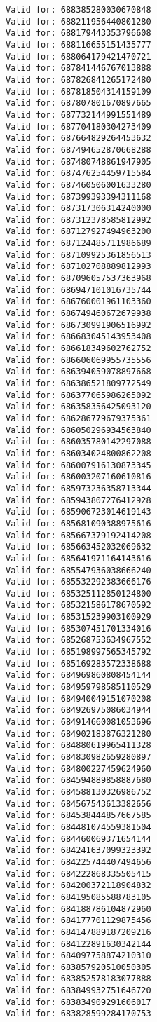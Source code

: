 \documentclass[11pt]{article}
\begin{document}
\begin{Verbatim}[commandchars=\\\{\}]
Valid for: 688385280030670848
Valid for: 688211956440801280
Valid for: 688179443353796608
Valid for: 688116655151435777
Valid for: 688064179421470721
Valid for: 687841446767013888
Valid for: 687826841265172480
Valid for: 687818504314159109
Valid for: 687807801670897665
Valid for: 687732144991551489
Valid for: 687704180304273409
Valid for: 687664829264453632
Valid for: 687494652870668288
Valid for: 687480748861947905
Valid for: 687476254459715584
Valid for: 687460506001633280
Valid for: 687399393394311168
Valid for: 687317306314240000
Valid for: 687312378585812992
Valid for: 687127927494963200
Valid for: 687124485711986689
Valid for: 687109925361856513
Valid for: 687102708889812993
Valid for: 687096057537363968
Valid for: 686947101016735744
Valid for: 686760001961103360
Valid for: 686749460672679938
Valid for: 686730991906516992
Valid for: 686683045143953408
Valid for: 686618349602762752
Valid for: 686606069955735556
Valid for: 686394059078897668
Valid for: 686386521809772549
Valid for: 686377065986265092
Valid for: 686358356425093120
Valid for: 686286779679375361
Valid for: 686050296934563840
Valid for: 686035780142297088
Valid for: 686034024800862208
Valid for: 686007916130873345
Valid for: 686003207160610816
Valid for: 685973236358713344
Valid for: 685943807276412928
Valid for: 685906723014619143
Valid for: 685681090388975616
Valid for: 685667379192414208
Valid for: 685663452032069632
Valid for: 685641971164143616
Valid for: 685547936038666240
Valid for: 685532292383666176
Valid for: 685325112850124800
Valid for: 685321586178670592
Valid for: 685315239903100929
Valid for: 685307451701334016
Valid for: 685268753634967552
Valid for: 685198997565345792
Valid for: 685169283572338688
Valid for: 684969860808454144
Valid for: 684959798585110529
Valid for: 684940049151070208
Valid for: 684926975086034944
Valid for: 684914660081053696
Valid for: 684902183876321280
Valid for: 684880619965411328
Valid for: 684830982659280897
Valid for: 684800227459624960
Valid for: 684594889858887680
Valid for: 684588130326986752
Valid for: 684567543613382656
Valid for: 684538444857667585
Valid for: 684481074559381504
Valid for: 684460069371654144
Valid for: 684241637099323392
Valid for: 684225744407494656
Valid for: 684222868335505415
Valid for: 684200372118904832
Valid for: 684195085588783105
Valid for: 684188786104872960
Valid for: 684177701129875456
Valid for: 684147889187209216
Valid for: 684122891630342144
Valid for: 684097758874210310
Valid for: 683857920510050305
Valid for: 683852578183077888
Valid for: 683849932751646720
Valid for: 683834909291606017
Valid for: 683828599284170753

\end{Verbatim}
\end{document}
